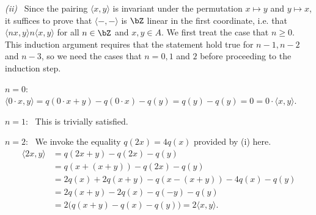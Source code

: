 \begin{homework}[e]
\begin{prf}
		\bigskip

		\noindent \emph{(ii)}~ Since the pairing $\langle x,y\rangle$ is invariant under the permutation $x \mapsto y$ and $y \mapsto x$, it suffices to prove that $\langle -,-\rangle$ is $\bZ$ linear in the first coordinate, i.e. that $\langle nx,y\rangle n\langle x,y\rangle$ for all $n \in \bZ$ and $x,y \in A$. We first treat the case that $n \geq 0$. This induction argument requires that the statement hold true for $n-1,n-2$ and $n - 3$, so we need the cases that $n = 0, 1$ and $2$ before proceeding to the induction step.

		\noindent \hspace{1em}\underline{$n = 0$}:~ $\langle 0 \cdot x,y\rangle = q(0\cdot x + y) - q(0\cdot x) - q(y) = q(y) - q(y) = 0 = 0\cdot \langle x,y\rangle$.

		\noindent \hspace{1em}\underline{$n = 1$}:~ This is trivially satisfied.

		\noindent \hspace{1em}\underline{$n = 2$}:~ We invoke the equality $q(2x) = 4q(x)$ provided by (i) here.
		\begin{align*}
			\langle 2x,y\rangle &= q(2x + y) - q(2x) - q(y) \\
				&= q(x + (x+y)) - q(2x) - q(y) \\
				&= 2q(x) + 2q(x+y) - q(x - (x+y)) - 4q(x) - q(y) \\
				&= 2q(x+y) - 2q(x) - q(-y) - q(y) \\
				&= 2\big(q(x+y) -q(x) - q(y)\big) = 2\langle x,y\rangle.
		\end{align*}
        

\end{prf}
\end{homework}
